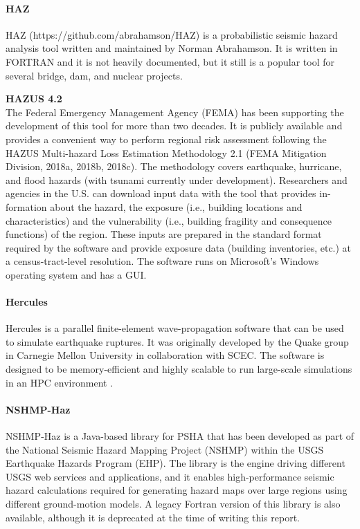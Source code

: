 \paragraph{HAZ} HAZ (https://github.com/abrahamson/HAZ) is a probabilistic seismic hazard analysis tool written and maintained by Norman Abrahamson. It is written in FORTRAN and it is not heavily documented, but it still is a popular tool for several bridge, dam, and nuclear projects.

\noindent\textbf{HAZUS 4.2} \\The Federal Emergency Management Agency (FEMA) has been supporting the development of this tool for more than two decades. It is publicly available and provides a convenient way to perform regional risk assessment following the HAZUS Multi-hazard Loss Estimation Methodology 2.1 (FEMA Mitigation Division, 2018a, 2018b, 2018c). The methodology covers earthquake, hurricane, and flood hazards (with tsunami currently under development). Researchers and agencies in the U.S. can download input data with the tool that provides in-formation about the hazard, the exposure (i.e., building locations and characteristics) and the vulnerability (i.e., building fragility and consequence functions) of the region. These inputs are prepared in the standard format required by the software and provide exposure data (building inventories, etc.) at a census-tract-level resolution. The software runs on Microsoft’s Windows operating system and has a GUI.

\paragraph{Hercules} Hercules \citep{tu2006mesh} is a parallel finite-element wave-propagation software that can be used to simulate earthquake ruptures. It was originally developed by the Quake group in Carnegie Mellon University in collaboration with SCEC. The software is designed to be memory-efficient and highly scalable to run large-scale simulations in an HPC environment \citep{taborda2010speeding}. 

\paragraph{NSHMP-Haz} NSHMP-Haz is a Java-based library for PSHA that has been developed as part of the National Seismic Hazard Mapping Project (NSHMP) within the USGS Earthquake Hazards Program (EHP). The library is the engine driving different USGS web services and applications, and it enables high-performance seismic hazard calculations required for generating hazard maps over large regions using different ground-motion models. A legacy Fortran version of this library is also available, although it is deprecated at the time of writing this report.


